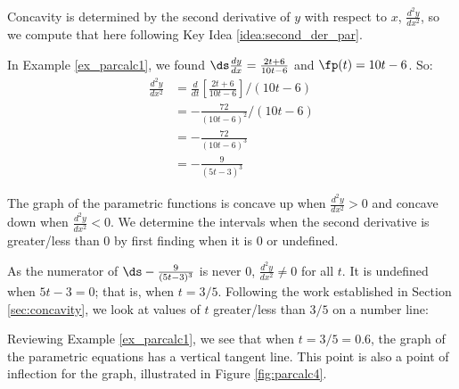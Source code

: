 {Concavity is determined by the second derivative of $y$ with respect to $x$, $\frac{d^2y}{dx^2}$, so we compute that here following Key Idea \ref{idea:second_der_par}.

In Example \ref{ex_parcalc1}, we found $\ds\frac{dy}{dx} = \frac{2t+6}{10t-6}$ and $\fp(t) = 10t-6$. So:
\begin{align*}
\frac{d^2y}{dx^2} &= \frac{d}{dt}\left[\frac{2t+6}{10t-6}\right]\Bigg/(10t-6) \\
				&= -\frac{72}{(10t-6)^2}\Bigg/(10t-6)\\
				&= -\frac{72}{(10t-6)^3} \\&= -\frac{9}{(5t-3)^3}
\end{align*}

The graph of the parametric functions is concave up when $\frac{d^2y}{dx^2} > 0$ and concave down when $\frac{d^2y}{dx^2} <0$. We determine the intervals when the second derivative is greater/less than 0 by first finding when it is 0 or undefined.

As the numerator of $\ds -\frac{9}{(5t-3)^3}$ is never 0, $\frac{d^2y}{dx^2} \neq 0$ for all $t$. It is undefined when $5t-3=0$; that is, when $t= 3/5$. Following the work established in Section \ref{sec:concavity}, we look at values of $t$ greater/less than $3/5$ on a number line:

\begin{center}\end{center}

Reviewing Example \ref{ex_parcalc1}, we see that when $t=3/5=0.6$, the graph of the parametric equations has a vertical tangent line. This point is also a point of inflection for the graph, illustrated in Figure \ref{fig:parcalc4}.}

